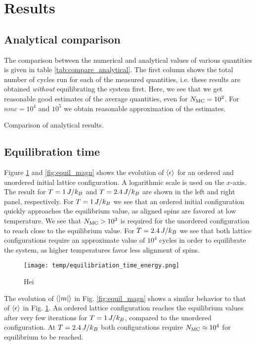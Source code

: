 \section{Results}\label{sec:results}
\subsection{Analytical comparison}\label{subsec_results:analytical}
The comparison between the numerical and analytical values of various quantities is given in table \ref{tab:compare_analytical}. The first column shows the total number of cycles run for each of the measured quantities, i.e. these results are obtained \textit{without} equilibrating the system first. Here, we see that we get reasonable good estimates of the average quantities, even for $N_\mathrm{MC}=10^2$. For $nmc=10^4$ and $10^5$ we obtain reasonable approximation of the estimates.  

\begin{table}[!ht]
    
    \caption{Comparison of analytical results. }
    \label{tab:compare_analytical}
\end{table}


\subsection{Equilibration time}\label{subsec_results:equilibriation_time}
Figure \ref{fig:equil_energy} and \ref{fig:equil_magn} shows the evolution of $\expval{\epsilon}$ for an ordered and unordered initial lattice configuration. A logarithmic scale is used on the $x$-axis. The result for $T=1\,J/k_B$ and $T=2.4\,J/k_B$ are shown in the left and right panel, respectively. For $T=1\,J/k_B$ we see that an ordered initial configuration quickly approaches the equilibrium value, as aligned spins are favored at low temperature. We see that $N_\mathrm{MC}>10^3$ is required for the unordered configuration to reach close to the equilibrium value. For $T=2.4\,J/k_B$ we see that both lattice configurations require an approximate value of $10^4$ cycles in order to equilibrate the system, as higher temperatures favor less alignment of spins.       
\begin{figure}[!ht]
    \texttt{[image: temp/equilibriation\_time\_energy.png]}
    \caption{Hei}
    \label{fig:equil_energy}
\end{figure}
The evolution of $\expval{\abs{m}}$ in Fig. \ref{fig:equil_magn} shows a similar behavior to that of $\expval{\epsilon}$ in Fig. \ref{fig:equil_energy}. An ordered lattice configuration reaches the equilibrium values after very few iterations for $T=1\,J/k_B$, compared to the unordered configuration. At $T=2.4\,J/k_B$ both configurations require $N_\mathrm{MC}\approx10^4$ for equilibrium to be reached. 

